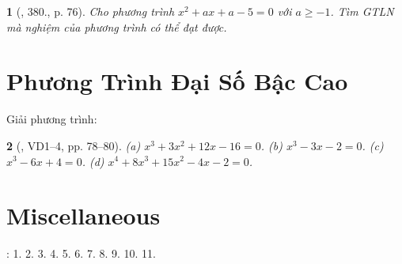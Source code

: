 \documentclass{article}
\newtheorem{baitoan}{}
\begin{document}
\begin{baitoan}[\cite{Binh_Toan_9_tap_2}, 380., p. 76]
	Cho phương trình $x^2 + ax + a - 5 = 0$ với $a\ge-1$. Tìm {\rm GTLN} mà nghiệm của phương trình có thể đạt được.
\end{baitoan}


\section{Phương Trình Đại Số Bậc Cao}
Giải phương trình:

\begin{baitoan}[\cite{Binh_Toan_9_tap_2}, VD1--4, pp. 78--80]
	(a) $x^3 + 3x^2 + 12x - 16 = 0$. (b) $x^3 - 3x - 2 = 0$. (c) $x^3 - 6x + 4 = 0$. (d) $x^4 + 8x^3 + 15x^2 - 4x - 2 = 0$.
\end{baitoan}


\section{Miscellaneous}
\cite[BTCCVII, \S3, pp. 66--67]{SGK_Toan_9_Canh_Dieu_tap_2}: 1. 2. 3. 4. 5. 6. 7. 8. 9. 10. 11.


\printbibliography[heading=bibintoc]
	
\end{document}
